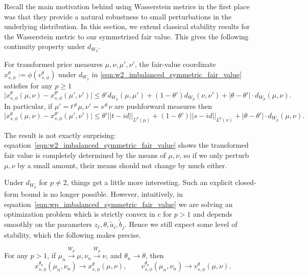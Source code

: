 \noindent Recall the main motivation behind using Wasserstein metrics in the first place was
that they provide a natural robustness to small perturbations in the underlying distribution.
In this section, we extend classical stability results for the Wasserstein metric to our symmetrized
fair value. This gives the following continuity property under $d_{W_2}$.

\begin{lemma}
    \label{lem:fv_continuity_w2}
    For transformed price measures $\mu,\nu,\mu',\nu'$, the fair-value coordinate $x_{s,\phi}^\theta:=\phi(v_{s,\phi}^\theta)$ under $d_{W_2}$ in \eqref{eqn:w2_imbalanced_symmetric_fair_value} satisfies for any $p \geq 1$
    \begin{equation}
        \Big| x_{s,\phi}^\theta(\mu, \nu) - x_{s,\phi}^{\theta'}(\mu', \nu') \Big | \leq \theta' d_{W_p}(\mu,\mu') + (1-\theta') d_{W_p}(\nu,\nu') + |\theta-\theta'| \cdot d_{W_p}(\mu,\nu).
    \end{equation}
    \noindent In particular, if $\mu' = t^\# \mu, \nu' = s^\# \nu$ are pushforward measures then
    \begin{equation}
        \Big| x_{s,\phi}^\theta(\mu, \nu) - x_{s,\phi}^{\theta'}(\mu', \nu') \Big | \leq \theta' ||t - id||_{L^p(\mu)} + (1-\theta') ||s-id||_{L^p(\nu)} + |\theta - \theta'| \cdot d_{W_p}(\mu,\nu).
    \end{equation}
\end{lemma}
%
The result is not exactly surprising: equation~\eqref{eqn:w2_imbalanced_symmetric_fair_value} shows the transformed fair value is completely determined by
the means of $\mu, \nu$, so if we only perturb $\mu, \nu$ by a small amount, their means should not change by much either.

Under $d_{W_p}$ for $p \neq 2$, things get a little more interesting.
Such an explicit closed-form bound is no longer possible. However, intuitively,
in equation~\eqref{eqn:wp_imbalanced_symmetric_fair_value} we are solving an optimization
problem which is strictly convex in $c$ for $p > 1$ and depends smoothly on the parameters
$z_\ell,\theta,\widetilde a_i,\widetilde b_j$. Hence we still expect some level of stability, which the following makes precise.

\begin{lemma}
\label{lem:wp_fv_stability}
    For any $p > 1$, if $\mu_n \xrightarrow{W_p} \mu, \nu_n \xrightarrow{W_p} \nu$, and $\theta_n \to \theta$, then
      \[x_{s,\phi}^{\theta_n}(\mu_n, \nu_n) \to x_{s,\phi}^\theta(\mu, \nu),
      \qquad v_{s,\phi}^{\theta_n}(\mu_n,\nu_n)\to v_{s,\phi}^\theta(\mu,\nu).\]
\end{lemma}

